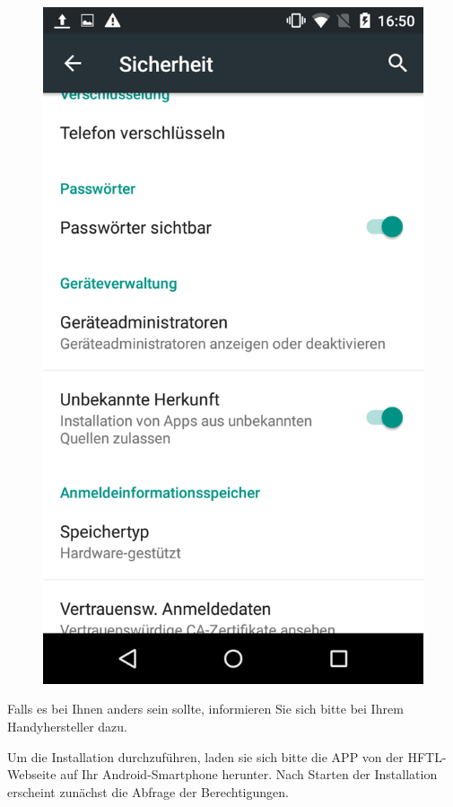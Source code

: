 \begin{figure}[h]
	\centering
	\includegraphics[scale=0.25]{03_Bedienungsanleitung/img/herkunft.png}
\end{figure}

Falls es bei Ihnen anders sein sollte, informieren Sie sich bitte bei Ihrem Handyhersteller dazu.

Um die Installation durchzuführen, laden sie sich bitte die APP von der HFTL-Webseite auf Ihr Android-Smartphone herunter.
Nach Starten der Installation erscheint zunächst die Abfrage der Berechtigungen.

